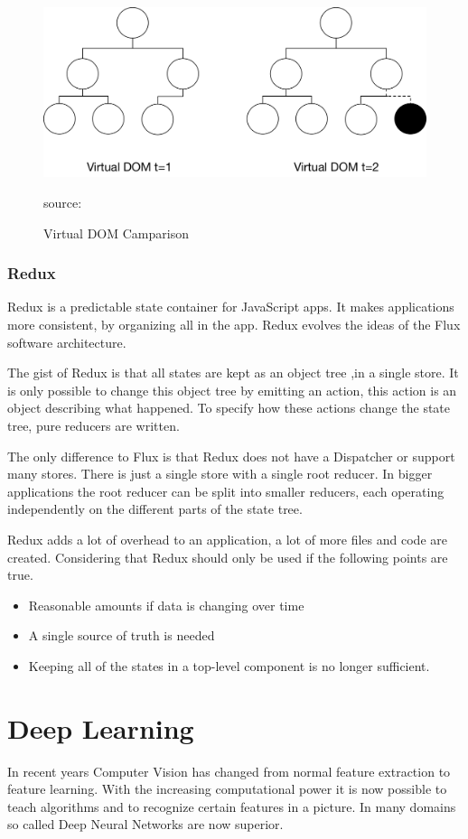 \begin{figure}[H]
	\centering
	\includegraphics[width=\linewidth]{bilder/grundlagen/VirtualDom.png}
	\caption{Virtual DOM Camparison} source:\cite{Component}
	\label{fig:COMPONENT}
\end{figure}

\newpage

\subsubsection{Redux}
Redux is a predictable state container for JavaScript apps. It makes applications more consistent, by organizing all in the app. Redux evolves the ideas of the Flux software architecture.
 
The gist of Redux is that all states are kept as an object tree ,in a single store. It is only possible to change this object tree by emitting an action, this action is an object describing what happened. To specify how these actions change the state tree, pure reducers are written.

The only difference to Flux is that Redux does not have a Dispatcher or support many stores. There is just a single store with a single root reducer. In bigger applications the root reducer can be split into smaller reducers, each operating independently on the different parts of the state tree. 

Redux adds a lot of overhead to an application, a lot of more files and code are created. Considering that Redux should only be used if the following points are true. 

\begin{itemize}
\item Reasonable amounts if data is changing over time
\item A single source of truth is needed
\item Keeping all of the states in a top-level component is no longer sufficient.
\end{itemize}




\section{Deep Learning}
In recent years Computer Vision has changed from normal feature extraction to feature learning. With the increasing computational power it is now possible to teach algorithms and to recognize certain features in a picture. In many domains so called Deep Neural Networks are now superior. 





